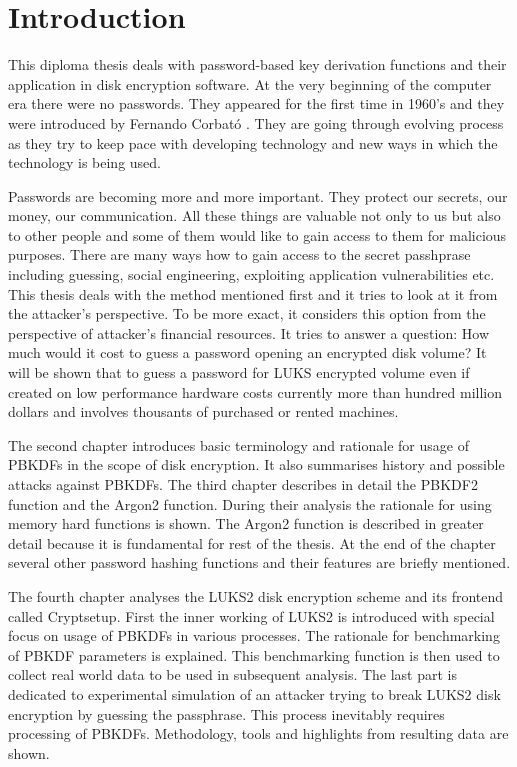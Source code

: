 \documentclass[nolof]{fithesis3}
\begin{document}
\chapter{Introduction}
This diploma thesis deals with password-based key derivation functions and their application in disk encryption software. At the very beginning of the computer era there were no passwords. They appeared for the first time in 1960's and they were introduced by Fernando Corbató \parencite{ctss}. They are going through evolving process as they try to keep pace with developing technology and new ways in which the technology is being used.

Passwords are becoming more and more important. They protect our secrets, our money, our communication. All these things are valuable not only to us but also to other people and some of them would like to gain access to them for malicious purposes. There are many ways how to gain access to the secret passhprase including guessing, social engineering, exploiting application vulnerabilities etc. This thesis deals with the method mentioned first and it tries to look at it from the attacker's perspective. To be more exact, it considers this option from the perspective of attacker's financial resources. It tries to answer a question: How much would it cost to guess a password opening an encrypted disk volume? It will be shown that to guess a password for LUKS encrypted volume even if created on low performance hardware costs currently more than hundred million dollars and involves thousants of purchased or rented machines.

The second chapter introduces basic terminology and rationale for usage of PBKDFs in the scope of disk encryption. It also summarises history and possible attacks against PBKDFs. The third chapter describes in detail the PBKDF2 function and the Argon2 function. During their analysis the rationale for using memory hard functions is shown. The Argon2 function is described in greater detail because it is fundamental for rest of the thesis. At the end of the chapter several other password hashing functions and their features are briefly mentioned.

The fourth chapter analyses the LUKS2 disk encryption scheme and its frontend called Cryptsetup. First the inner working of LUKS2 is introduced with special focus on usage of PBKDFs in various processes. The rationale for benchmarking of PBKDF parameters is explained. This benchmarking function is then used to collect real world data to be used in subsequent analysis. The last part is dedicated to experimental simulation of an attacker trying to break LUKS2 disk encryption by guessing the passphrase. This process inevitably requires processing of PBKDFs. Methodology, tools and highlights from resulting data are shown.
\end{document}
